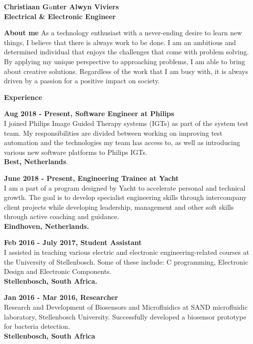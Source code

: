 \documentclass[a4paper,12pt,final]{memoir}
\newcommand{\Sep}{\vspace{1.5em}}
\newcommand{\SmallSep}{\vspace{0.5em}}
\newenvironment{AboutMe}
	{\ignorespaces\textbf{\color{RoyalBlue} About me}}
	{\Sep\ignorespacesafterend}
\newcommand{\CVSection}[1]
	{\Large\textbf{#1}\par
	\SmallSep\normalsize\normalfont}
\newcommand{\CVItem}[1]
	{\textbf{\color{RoyalBlue} #1}}
\begin{document}
\framebreak


\Huge\bfseries {\color{RoyalBlue} Christiaan G$\ddot{u}$nter Alwyn Viviers} \\
\Large\bfseries  Electrical \& Electronic Engineer \\

\normalsize\normalfont

\begin{AboutMe}
As a technology enthusiast with a never-ending desire to learn new things, I believe that there is always work to be done. I am an ambitious and determined individual that enjoys the challenges that come with problem solving. By applying my unique perspective to approaching problems, I am able to bring about creative solutions. Regardless of the work that I am busy with, it is always driven by a passion for a positive impact on society.
\end{AboutMe}

\CVSection{Experience}
\CVItem{Aug 2018 - Present, Software Engineer at Philips}\\
I joined Philips Image Guided Therapy systems (IGTs) as part of the system test team. My responsibilities are divided between working on improving test automation and the technologies my team has access to, as well as introducing various new software platforms to Philips IGTs.\\ \textbf{Best, Netherlands}.\SmallSep

\CVItem{June 2018 - Present, Engineering Trainee at Yacht}\\
I am a part of a program designed by Yacht to accelerate personal and technical growth. The goal is to develop specialist engineering skills through intercompany client projects while developing leadership, management and other soft skills through active coaching and guidance.\\ \textbf{Eindhoven, Netherlands.}\SmallSep

\CVItem{Feb 2016 - July 2017, Student Assistant}\\
I assisted in teaching various electric and electronic engineering-related courses at the University of Stellenbosch. Some of these include: C programming, Electronic Design and Electronic Components.\\ \textbf{Stellenbosch, South Africa.}\SmallSep

\CVItem{Jan 2016 - Mar 2016, Researcher}\\
Research and Development of Biosensors and Microfluidics at SAND microfluidic laboratory, Stellenbosch University. Successfully developed a biosensor prototype for bacteria detection.\\ \textbf{Stellenbosch, South Africa}
\SmallSep
\end{document}
